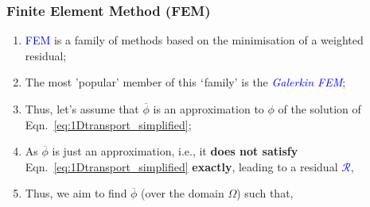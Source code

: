 \documentclass[10pt,compress,handout,ignorenonframetext]{beamer}
\begin{document}
\begin{frame}
 \frametitle{Finite Element Method (FEM)} 

\begin{enumerate}
  \item <1-> \textcolor{blue}{FEM} is a family of methods based on the minimisation of a weighted residual;
  \item <2-> The most 'popular' member of this $\lq$family' is the \textcolor{blue}{\it Galerkin FEM};
  \item <3-> Thus, let's assume that $\overline{\phi}$ is an approximation to $\phi$ of the solution of Eqn.~\ref{eq:1Dtransport_simplified};
  \item <4-> As $\overline{\phi}$ is just an approximation, i.e., it {\bf does not satisfy} Eqn.~\ref{eq:1Dtransport_simplified} {\bf exactly}, leading to a residual \textcolor{blue}{$\mathcal{R}$},

  \item<5-> Thus, we aim to find $\overline{\phi}$ (over the domain $\Omega$) such that,

   
\end{enumerate}  
 
\end{frame}
\end{document}
